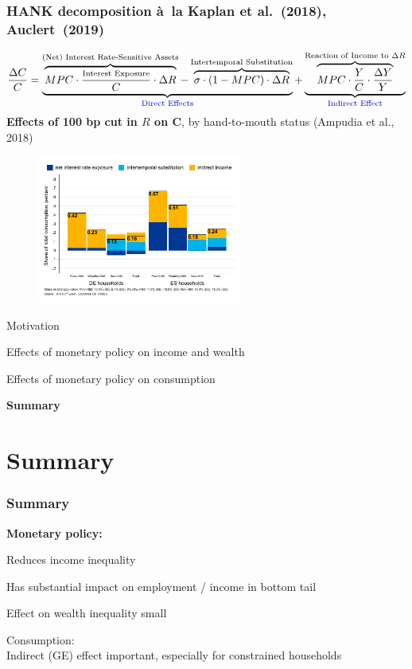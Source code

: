 \documentclass[pdflatex,aspectratio=169]{beamer}
\newcommand{\jemph}[1]{{\color{StataDarkBlue}#1}}
\newcommand{\jbemph}[1]{\textbf{\color{SlideNavy}#1}}
\begin{document}
\begin{frame}\frametitle{\bf HANK decomposition \`a\ la Kaplan et al.~(2018), Auclert~(2019)}
\vspace*{-2.5mm}
\footnotesize
$$
\frac{\Delta C}{C}=\underbrace{\overbrace{MPC\cdot\frac{\text{\scriptsize{Interest Exposure}}}{C}\cdot\Delta R}^{\text{(Net) Interest Rate-Sensitive Assets}}-\overbrace{\sigma\cdot(1-MPC)\cdot\Delta R}^{\text{Intertemporal Substitution}}}_{\text{\jemph{Direct Effects}}}+\underbrace{\overbrace{MPC\cdot\frac{Y}{C}\cdot\frac{\Delta Y}{Y}}^{\text{Reaction of Income to $\Delta R$}}}_{\text{\jemph{Indirect Effect}}}
$$
\small
\jbemph{Effects of 100 bp cut in $R$ on C}, by hand-to-mouth status (Ampudia et al., 2018)
\begin{figure}
\begin{center}
\includegraphics[width=0.6\textwidth]{./figures/cDecomp3.pdf}
\end{center}
\end{figure}
\end{frame}



\begin{frame}
\bi\setlength{\itemsep}{3mm}
\item Motivation
\item Effects of monetary policy on income and wealth
\item Effects of monetary policy on consumption
\item \jbemph{Summary}
\ei
\end{frame}


\section{Summary}
\begin{frame}\frametitle{\bf Summary}
\jbemph{\large Monetary policy:}\\
\bi\setlength{\itemsep}{3mm}
\item \jemph{Reduces income inequality}
\item Has substantial impact on employment / income in bottom tail
\item Effect on wealth inequality small
\item \jemph{Consumption:}\\ Indirect (GE) effect important, especially for constrained households
\ei



\end{frame}
\end{document}
